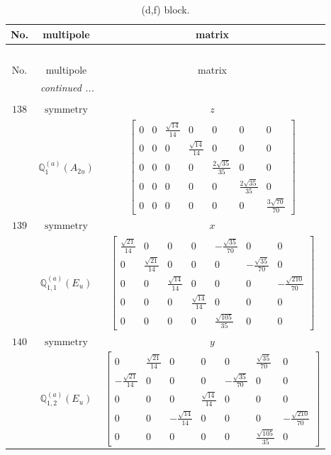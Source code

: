 \documentclass[fleqn,8pt,landscape]{jsarticle}
\begin{document}
\begin{longtable}{ccc}
\caption{(d,f) block.}
 \\
 \hline \hline
No. & multipole & matrix \\ \hline \endfirsthead

\multicolumn{2}{l}{\tablename\ \thetable{}} \\
 \hline \hline
No. & multipole & matrix \\ \hline \endhead

 \hline \hline
\multicolumn{2}{r}{\footnotesize\it continued ...} \\ \endfoot

 \hline \hline
\multicolumn{2}{r}{} \\ \endlastfoot

$ 138 $ & $ \text{symmetry} $ & $ z $ \\
$  $ & $ \mathbb{Q}_{1}^{(a)}(A_{2u}) $ & $ \begin{bmatrix} 0 & 0 & \frac{\sqrt{14}}{14} & 0 & 0 & 0 & 0 \\ 0 & 0 & 0 & \frac{\sqrt{14}}{14} & 0 & 0 & 0 \\ 0 & 0 & 0 & 0 & \frac{2 \sqrt{35}}{35} & 0 & 0 \\ 0 & 0 & 0 & 0 & 0 & \frac{2 \sqrt{35}}{35} & 0 \\ 0 & 0 & 0 & 0 & 0 & 0 & \frac{3 \sqrt{70}}{70} \end{bmatrix} $ \\ \hline
$ 139 $ & $ \text{symmetry} $ & $ x $ \\
$  $ & $ \mathbb{Q}_{1,1}^{(a)}(E_{u}) $ & $ \begin{bmatrix} \frac{\sqrt{21}}{14} & 0 & 0 & 0 & - \frac{\sqrt{35}}{70} & 0 & 0 \\ 0 & \frac{\sqrt{21}}{14} & 0 & 0 & 0 & - \frac{\sqrt{35}}{70} & 0 \\ 0 & 0 & \frac{\sqrt{14}}{14} & 0 & 0 & 0 & - \frac{\sqrt{210}}{70} \\ 0 & 0 & 0 & \frac{\sqrt{14}}{14} & 0 & 0 & 0 \\ 0 & 0 & 0 & 0 & \frac{\sqrt{105}}{35} & 0 & 0 \end{bmatrix} $ \\ \hline
$ 140 $ & $ \text{symmetry} $ & $ y $ \\
$  $ & $ \mathbb{Q}_{1,2}^{(a)}(E_{u}) $ & $ \begin{bmatrix} 0 & \frac{\sqrt{21}}{14} & 0 & 0 & 0 & \frac{\sqrt{35}}{70} & 0 \\ - \frac{\sqrt{21}}{14} & 0 & 0 & 0 & - \frac{\sqrt{35}}{70} & 0 & 0 \\ 0 & 0 & 0 & \frac{\sqrt{14}}{14} & 0 & 0 & 0 \\ 0 & 0 & - \frac{\sqrt{14}}{14} & 0 & 0 & 0 & - \frac{\sqrt{210}}{70} \\ 0 & 0 & 0 & 0 & 0 & \frac{\sqrt{105}}{35} & 0 \end{bmatrix} $ \\ \hline

\end{longtable}
\end{document}
